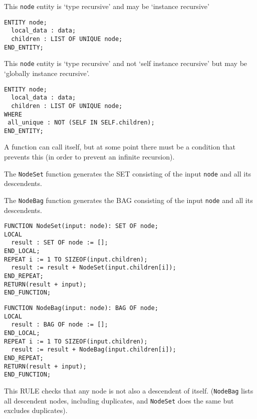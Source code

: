 
    This \texttt{node} entity is `type recursive' and may be 
`instance recursive'

\begin{verbatim}
ENTITY node;
  local_data : data;
  children : LIST OF UNIQUE node;
END_ENTITY;
\end{verbatim} 

    This \texttt{node} entity is `type recursive' and not `self instance
recursive' but may be `globally instance recursive'.

\begin{verbatim}
ENTITY node;
  local_data : data;
  children : LIST OF UNIQUE node;
WHERE
 all_unique : NOT (SELF IN SELF.children);
END_ENTITY;
\end{verbatim} 


\begin{remarks}
\remintro
{}

A function can call itself, but at some point there must be a condition
that prevents this (in order to prevent an infinite recursion).

The \texttt{NodeSet} function generates the SET consisting of the
input \texttt{node} and all its descendents.

The \texttt{NodeBag} function generates the BAG consisting of the
input \texttt{node} and all its descendents.

\remend
\end{remarks}


\begin{verbatim}
FUNCTION NodeSet(input: node): SET OF node;
LOCAL
  result : SET OF node := [];
END_LOCAL;
REPEAT i := 1 TO SIZEOF(input.children);
  result := result + NodeSet(input.children[i]);
END_REPEAT;
RETURN(result + input);
END_FUNCTION;
\end{verbatim}

\begin{verbatim}
FUNCTION NodeBag(input: node): BAG OF node;
LOCAL
  result : BAG OF node := [];
END_LOCAL;
REPEAT i := 1 TO SIZEOF(input.children);
  result := result + NodeBag(input.children[i]);
END_REPEAT;
RETURN(result + input);
END_FUNCTION;
\end{verbatim}


\begin{remarks}
\remintro
{}

    This RULE checks that any node is not also a descendent of itself.
(\texttt{NodeBag} lists all descendent nodes, including duplicates, 
and \texttt{NodeSet} 
does the same but excludes duplicates).

\remend
\end{remarks}

